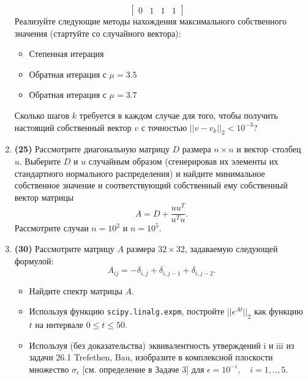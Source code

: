 \documentclass[prb,papersize=a4paper,notitlepage]{revtex4-1}%
\begin{document}
\begin{enumerate}
$$\begin{bmatrix}
0 & 1 & 1 & 1
\end{bmatrix}\quad
$$
Реализуйте следующие методы нахождения максимального собственного значения (стартуйте со случайного вектора):
\begin{itemize}
\item Степенная итерация
\item Обратная итерация с $\mu = 3.5$
\item Обратная итерация с $\mu = 3.7$
\end{itemize}
Сколько шагов $k$ требуется в каждом случае для того, чтобы получить настоящий собственный вектор $v$ с точностью $||v-v_k||_2 < 10^{-3}$?
\item \textbf{(25)} Рассмотрите диагональную матрицу $D$ размера $n\times n$ и вектор--столбец $u$. Выберите $D$ и $u$ случайным образом (сгенерировав их элементы их стандартного нормального распределения) и найдите минимальное собственное значение и соответствующий собственный ему собственный вектор матрицы
$$A = D + \frac{u u^T}{u^T u}.$$ Рассмотрите случаи $n=10^2$ и $n=10^5$.
\item \textbf{(30)} Рассмотрите матрицу $A$ размера $32\times 32$, задаваемую следующей формулой:
$$
A_{ij} = -\delta_{i,j} + \delta_{i, j-1} + \delta_{i, j-2}.
$$
\begin{itemize}
\item Найдите спектр матрицы $A$.
\item Используя функцию \lstinline{scipy.linalg.expm}, постройте $||e^{At}||_2$ как функцию $t$ на интервале $0\le t \le 50$.
\item Используя (без доказательства) эквивалентность утверждений i и iii из задачи 26.1 Trefethen, Bau, изобразите в комплексной плоскости множество $\sigma_\epsilon$ [см. определение в Задаче 3] для $\epsilon = 10^{-i},\quad i=1,..,5$.
\end{itemize}
\end{enumerate}
\end{document}
